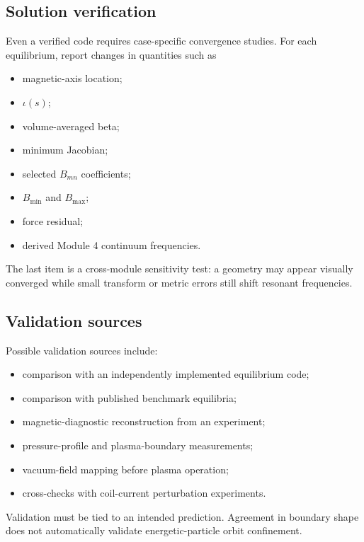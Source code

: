 \subsection{Solution verification}
Even a verified code requires case-specific convergence studies. For each equilibrium, report changes in quantities such as
\begin{itemize}[leftmargin=1.6em]
\item magnetic-axis location;
\item $\iota(s)$;
\item volume-averaged beta;
\item minimum Jacobian;
\item selected $B_{mn}$ coefficients;
\item $B_{\min}$ and $B_{\max}$;
\item force residual;
\item derived Module 4 continuum frequencies.
\end{itemize}
The last item is a cross-module sensitivity test: a geometry may appear visually converged while small transform or metric errors still shift resonant frequencies.

\subsection{Validation sources}
Possible validation sources include:
\begin{itemize}[leftmargin=1.6em]
\item comparison with an independently implemented equilibrium code;
\item comparison with published benchmark equilibria;
\item magnetic-diagnostic reconstruction from an experiment;
\item pressure-profile and plasma-boundary measurements;
\item vacuum-field mapping before plasma operation;
\item cross-checks with coil-current perturbation experiments.
\end{itemize}
Validation must be tied to an intended prediction. Agreement in boundary shape does not automatically validate energetic-particle orbit confinement.


